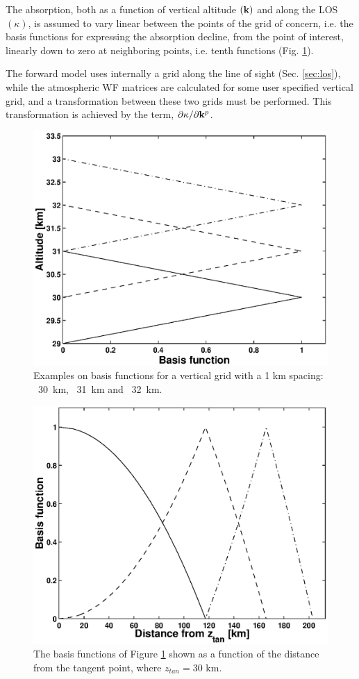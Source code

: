  The absorption, both as a function of vertical altitude $(\mathbf{k})$
 and along the LOS $(\kappa)$, is assumed to vary linear between the
 points of the grid of concern, i.e. the basis functions for
 expressing the absorption decline, from the point of interest,
 linearly down to zero at neighboring points, i.e.  tenth functions
 (Fig.  \ref{fig:wfuns:zbasis}).
 

 The forward model uses internally a grid along the line of sight
 (Sec. \ref{sec:los}), while the atmospheric WF matrices are
 calculated for some user specified vertical grid, and a
 transformation between these two grids must be performed. This 
 transformation is achieved by the term,
 $\partial\kappa/ \partial \mathbf{k}^p$.

 \begin{figure}[t]
  \begin{center}
   \includegraphics*[width=0.7\hsize]{Figs/fig_absbasis_z.eps}
   \caption{Examples on basis functions for a vertical grid with a 1 km
            spacing: \lsolid~30~km, \ldashed~31~km and \ldashdot~32~km.}
   \label{fig:wfuns:zbasis}  
  \end{center}
 \end{figure}

 \begin{figure}[t]
  \begin{center}
   \includegraphics*[width=0.7\hsize]{Figs/fig_absbasis_l.eps}
   \caption{The basis functions of Figure \ref{fig:wfuns:zbasis} shown
            as a function of the distance from the tangent point, where
            $z_{tan}=30$ km.}
   \label{fig:wfuns:lbasis}  
  \end{center}
 \end{figure}
 
